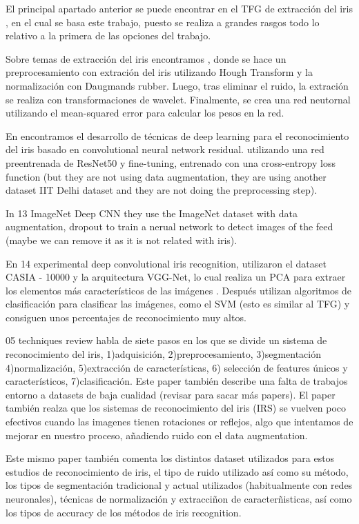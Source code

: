  \label{capitulo6}

El principal apartado anterior se puede  encontrar en el TFG de extracción del iris \cite{tfg_iris_2020}, en el cual se basa este trabajo, puesto se realiza a grandes rasgos
todo lo relativo a la primera de las opciones del trabajo.

Sobre temas de extracción del iris encontramos \cite{abdullah_iris_2015}, donde se hace un preprocesamiento con extración del iris utilizando Hough Transform y la 
normalización con Daugmands rubber. Luego, tras eliminar el ruido, la extración se realiza con transformaciones de wavelet. Finalmente, se crea una red neutornal
utilizando el mean-squared error para calcular los pesos en la red.

En \cite{minaee_deepiris_2019} encontramos el desarrollo de técnicas de deep learning para el reconocimiento del iris basado en convolutional neural network residual. utilizando una red preentrenada 
de ResNet50 y fine-tuning, entrenado con una cross-entropy loss function (but they are not using data augmentation, they are using another dataset IIT Delhi dataset and they are 
not doing the preprocessing step).

In 13 ImageNet Deep CNN they use the ImageNet dataset with data augmentation, dropout to train a nerual network to detect images of the feed (maybe we can remove it as
it is not related with iris).

En 14 experimental deep convolutional iris recognition, utilizaron el dataset CASIA - 10000 y la arquitectura VGG-Net, lo cual realiza un PCA para extraer los elementos
más característicos de las imágenes . Después utilizan algoritmos de clasificación para clasificar las imágenes, como el SVM (esto es similar al TFG) y consiguen unos percentajes
de reconocimiento muy altos.

05 techniques review habla de siete pasos en los que se divide un sistema de reconocimiento del iris, 1)adquisición, 2)preprocesamiento, 3)segmentación
 4)normalización, 5)extracción de características, 6) selección de features únicos y característicos, 7)clasificación. Este paper también describe una falta de
 trabajos entorno a datasets de baja cualidad (revisar para sacar más papers). El paper también realza que los sistemas de reconocimiento del iris (IRS) se vuelven 
 poco efectivos cuando las imagenes tienen rotaciones or reflejos, algo que intentamos de mejorar en nuestro proceso, añadiendo ruido con el data augmentation.

 Este mismo paper también comenta los distintos dataset utilizados para estos estudios de reconocimiento de iris, el tipo de ruido utilizado así como su método,
 los tipos de segmentación tradicional y actual utilizados (habitualmente con redes neuronales), técnicas de normalización y extracciñon de caracterñisticas, así 
 como los tipos de accuracy de los métodos de iris recognition.

